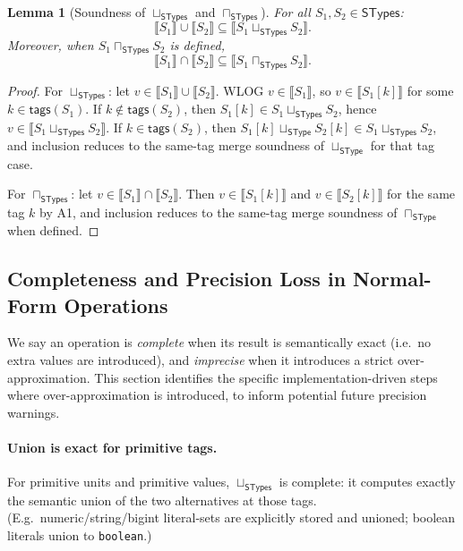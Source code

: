 \documentclass[11pt]{article}
\newtheorem{lemma}[theorem]{Lemma}
\newcommand{\sem}[1]{\llbracket #1 \rrbracket}
\newcommand{\SType}{\mathsf{SType}}
\newcommand{\STypes}{\mathsf{STypes}}
\newcommand{\tags}{\mathsf{tags}}
\begin{document}
\begin{lemma}[Soundness of \(\sqcup_{\STypes}\) and \(\sqcap_{\STypes}\)]
\label{lem:stypes-union-inter-sound}
For all \(S_1,S_2 \in \STypes\):
\[
\sem{S_1} \cup \sem{S_2} \subseteq \sem{S_1 \sqcup_{\STypes} S_2}.
\]
Moreover, when \(S_1 \sqcap_{\STypes} S_2\) is defined,
\[
\sem{S_1} \cap \sem{S_2} \subseteq \sem{S_1 \sqcap_{\STypes} S_2}.
\]
\end{lemma}

\begin{proof}
For \(\sqcup_{\STypes}\): let \(v \in \sem{S_1} \cup \sem{S_2}\). WLOG \(v \in \sem{S_1}\), so \(v \in \sem{S_1[k]}\) for some \(k \in \tags(S_1)\).
If \(k \notin \tags(S_2)\), then \(S_1[k] \in S_1 \sqcup_{\STypes} S_2\), hence \(v \in \sem{S_1 \sqcup_{\STypes} S_2}\).
If \(k \in \tags(S_2)\), then \(S_1[k]\sqcup_{\SType}S_2[k]\in S_1\sqcup_{\STypes}S_2\), and inclusion reduces to the same-tag merge soundness of \(\sqcup_{\SType}\) for that tag case.

For \(\sqcap_{\STypes}\): let \(v \in \sem{S_1}\cap \sem{S_2}\). Then \(v \in \sem{S_1[k]}\) and \(v \in \sem{S_2[k]}\) for the same tag \(k\) by A1, and inclusion reduces to the same-tag merge soundness of \(\sqcap_{\SType}\) when defined.
\end{proof}

\subsection{Completeness and Precision Loss in Normal-Form Operations}
\label{sec:stypes-precision-loss}

We say an operation is \emph{complete} when its result is semantically exact (i.e.\ no extra values are introduced), and \emph{imprecise} when it introduces a strict over-approximation.
This section identifies the specific implementation-driven steps where over-approximation is introduced, to inform potential future precision warnings.

\paragraph{Union is exact for primitive tags.}
For primitive units and primitive values, \(\sqcup_{\STypes}\) is complete: it computes exactly the semantic union of the two alternatives at those tags.
(E.g.\ numeric/string/bigint literal-sets are explicitly stored and unioned; boolean literals union to \texttt{boolean}.)
\end{document}

